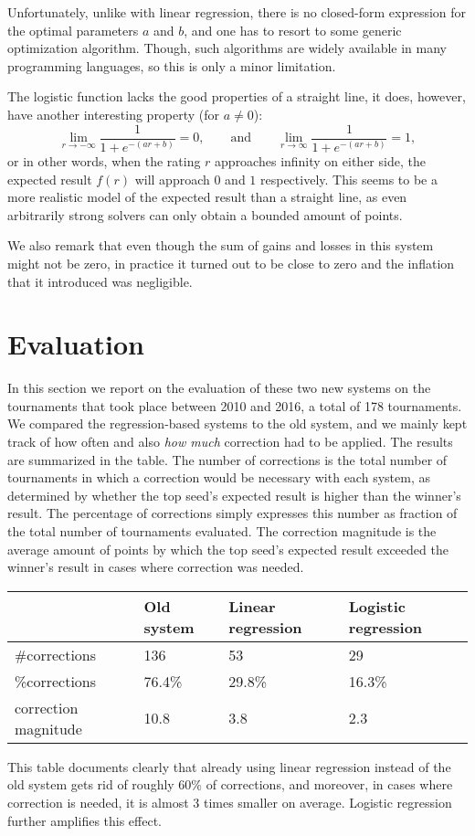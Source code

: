 \documentclass{article}
\begin{document}
Unfortunately, unlike with linear regression, there is no closed-form expression for the optimal parameters $a$ and $b$, and one has to resort to some generic optimization algorithm.
Though, such algorithms are widely available in many programming languages, so this is only a minor limitation.

The logistic function lacks the good properties of a straight line, it does, however, have another interesting property (for $a\neq 0$):
\[\lim_{r\rightarrow -\infty}\frac{1}{1+e^{-(ar+b)}}=0,\qquad\text{and}\qquad\lim_{r\rightarrow \infty}\frac{1}{1+e^{-(ar+b)}}=1,\]
or in other words, when the rating $r$ approaches infinity on either side, the expected result $f(r)$ will approach $0$ and $1$ respectively.
This seems to be a more realistic model of the expected result than a straight line, as even arbitrarily strong solvers can only obtain a bounded amount of points.

We also remark that even though the sum of gains and losses in this system might not be zero, in practice it turned out to be close to zero and the inflation that it introduced was negligible.
\section{Evaluation}
In this section we report on the evaluation of these two new systems on the tournaments that took place between 2010 and 2016, a total of 178 tournaments.
We compared the regression-based systems to the old system, and we mainly kept track of how often and also \emph{how much} correction had to be applied.
The results are summarized in the table.
The number of corrections is the total number of tournaments in which a correction would be necessary with each system, as determined by whether the top seed's expected result is higher than the winner's result.
The percentage of corrections simply expresses this number as fraction of the total number of tournaments evaluated.
The correction magnitude is the average amount of points by which the top seed's expected result exceeded the winner's result in cases where correction was needed.
\begin{table}[H]
\begin{center}
\begin{tabular}{@{}llll@{}}
\toprule
&Old system&Linear regression&Logistic regression\\
\midrule
\#corrections&136 &53 &29 \\
\%corrections&76.4\% &29.8\% &16.3\% \\
correction magnitude&10.8 &3.8 &2.3 \\
\bottomrule
\end{tabular}
\end{center}
\end{table}
This table documents clearly that already using linear regression instead of the old system gets rid of roughly 60\% of corrections, and moreover, in cases where correction is needed, it is almost 3 times smaller on average.
Logistic regression further amplifies this effect.
\end{document}
